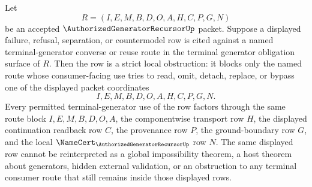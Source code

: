 \begin{corollary}
\label{cor:authorized-generator-recursor-terminal-generator-strict-obstruction}
Let
$$
R=(I,E,M,B,D,O,A,H,C,P,G,N)
$$
be an accepted $\AuthorizedGeneratorRecursorUp$ packet. Suppose a displayed failure, refusal, separation, or countermodel row is cited against a named terminal-generator converse or reuse route in the terminal generator obligation surface of $R$. Then the row is a strict local obstruction: it blocks only the named route whose consumer-facing use tries to read, omit, detach, replace, or bypass one of the displayed packet coordinates
$$
I,E,M,B,D,O,A,H,C,P,G,N.
$$
Every permitted terminal-generator use of the row factors through the same route block $I,E,M,B,D,O,A$, the componentwise transport row $H$, the displayed continuation readback row $C$, the provenance row $P$, the ground-boundary row $G$, and the local $\NameCert_{\AuthorizedGeneratorRecursorUp}$ row $N$. The same displayed row cannot be reinterpreted as a global impossibility theorem, a host theorem about generators, hidden external validation, or an obstruction to any terminal consumer route that still remains inside those displayed rows.
\end{corollary}
